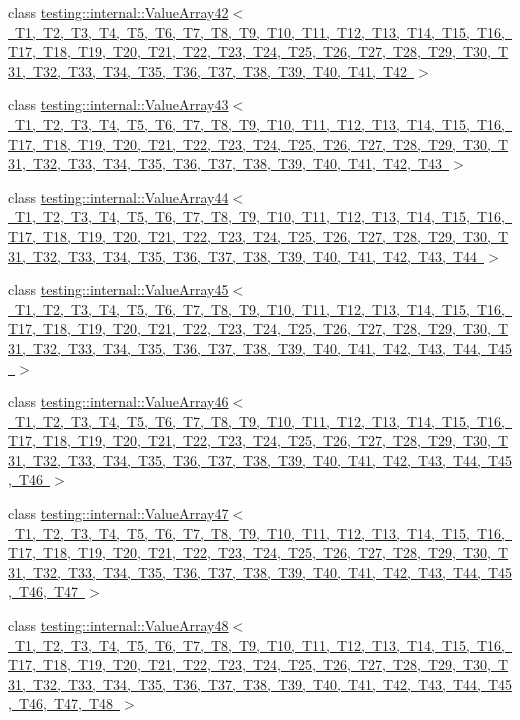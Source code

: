 \begin{DoxyCompactItemize}
\item 
class \mbox{\hyperlink{classtesting_1_1internal_1_1_value_array42}{testing\+::internal\+::\+Value\+Array42$<$ T1, T2, T3, T4, T5, T6, T7, T8, T9, T10, T11, T12, T13, T14, T15, T16, T17, T18, T19, T20, T21, T22, T23, T24, T25, T26, T27, T28, T29, T30, T31, T32, T33, T34, T35, T36, T37, T38, T39, T40, T41, T42 $>$}}
\item 
class \mbox{\hyperlink{classtesting_1_1internal_1_1_value_array43}{testing\+::internal\+::\+Value\+Array43$<$ T1, T2, T3, T4, T5, T6, T7, T8, T9, T10, T11, T12, T13, T14, T15, T16, T17, T18, T19, T20, T21, T22, T23, T24, T25, T26, T27, T28, T29, T30, T31, T32, T33, T34, T35, T36, T37, T38, T39, T40, T41, T42, T43 $>$}}
\item 
class \mbox{\hyperlink{classtesting_1_1internal_1_1_value_array44}{testing\+::internal\+::\+Value\+Array44$<$ T1, T2, T3, T4, T5, T6, T7, T8, T9, T10, T11, T12, T13, T14, T15, T16, T17, T18, T19, T20, T21, T22, T23, T24, T25, T26, T27, T28, T29, T30, T31, T32, T33, T34, T35, T36, T37, T38, T39, T40, T41, T42, T43, T44 $>$}}
\item 
class \mbox{\hyperlink{classtesting_1_1internal_1_1_value_array45}{testing\+::internal\+::\+Value\+Array45$<$ T1, T2, T3, T4, T5, T6, T7, T8, T9, T10, T11, T12, T13, T14, T15, T16, T17, T18, T19, T20, T21, T22, T23, T24, T25, T26, T27, T28, T29, T30, T31, T32, T33, T34, T35, T36, T37, T38, T39, T40, T41, T42, T43, T44, T45 $>$}}
\item 
class \mbox{\hyperlink{classtesting_1_1internal_1_1_value_array46}{testing\+::internal\+::\+Value\+Array46$<$ T1, T2, T3, T4, T5, T6, T7, T8, T9, T10, T11, T12, T13, T14, T15, T16, T17, T18, T19, T20, T21, T22, T23, T24, T25, T26, T27, T28, T29, T30, T31, T32, T33, T34, T35, T36, T37, T38, T39, T40, T41, T42, T43, T44, T45, T46 $>$}}
\item 
class \mbox{\hyperlink{classtesting_1_1internal_1_1_value_array47}{testing\+::internal\+::\+Value\+Array47$<$ T1, T2, T3, T4, T5, T6, T7, T8, T9, T10, T11, T12, T13, T14, T15, T16, T17, T18, T19, T20, T21, T22, T23, T24, T25, T26, T27, T28, T29, T30, T31, T32, T33, T34, T35, T36, T37, T38, T39, T40, T41, T42, T43, T44, T45, T46, T47 $>$}}
\item 
class \mbox{\hyperlink{classtesting_1_1internal_1_1_value_array48}{testing\+::internal\+::\+Value\+Array48$<$ T1, T2, T3, T4, T5, T6, T7, T8, T9, T10, T11, T12, T13, T14, T15, T16, T17, T18, T19, T20, T21, T22, T23, T24, T25, T26, T27, T28, T29, T30, T31, T32, T33, T34, T35, T36, T37, T38, T39, T40, T41, T42, T43, T44, T45, T46, T47, T48 $>$}}

\end{DoxyCompactItemize}
